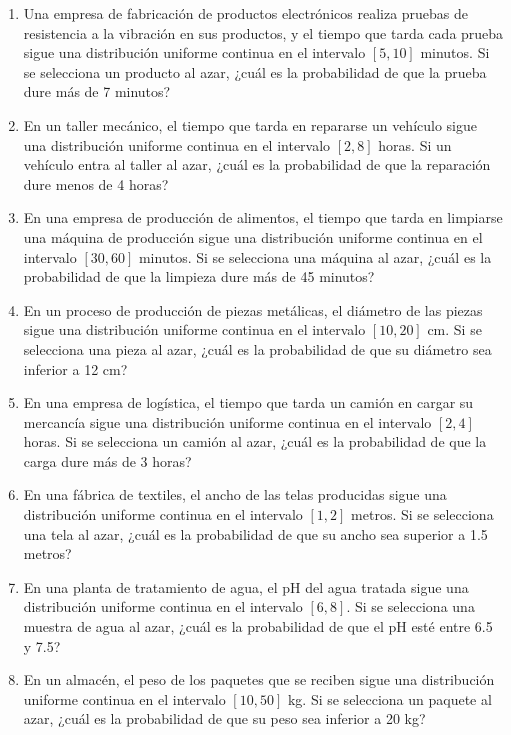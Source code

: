 \begin{Ejer}
\begin{enumerate}
    \item Una empresa de fabricación de productos electrónicos realiza pruebas de resistencia a la vibración en sus productos, y el tiempo que tarda cada prueba sigue una distribución uniforme continua en el intervalo $[5, 10]$ minutos. Si se selecciona un producto al azar, ¿cuál es la probabilidad de que la prueba dure más de 7 minutos?

    \item En un taller mecánico, el tiempo que tarda en repararse un vehículo sigue una distribución uniforme continua en el intervalo $[2, 8]$ horas. Si un vehículo entra al taller al azar, ¿cuál es la probabilidad de que la reparación dure menos de 4 horas?

    \item En una empresa de producción de alimentos, el tiempo que tarda en limpiarse una máquina de producción sigue una distribución uniforme continua en el intervalo $[30, 60]$ minutos. Si se selecciona una máquina al azar, ¿cuál es la probabilidad de que la limpieza dure más de 45 minutos?

    \item En un proceso de producción de piezas metálicas, el diámetro de las piezas sigue una distribución uniforme continua en el intervalo $[10, 20]$ cm. Si se selecciona una pieza al azar, ¿cuál es la probabilidad de que su diámetro sea inferior a 12 cm?

    \item En una empresa de logística, el tiempo que tarda un camión en cargar su mercancía sigue una distribución uniforme continua en el intervalo $[2, 4]$ horas. Si se selecciona un camión al azar, ¿cuál es la probabilidad de que la carga dure más de 3 horas?

    \item En una fábrica de textiles, el ancho de las telas producidas sigue una distribución uniforme continua en el intervalo $[1, 2]$ metros. Si se selecciona una tela al azar, ¿cuál es la probabilidad de que su ancho sea superior a 1.5 metros?

    \item En una planta de tratamiento de agua, el pH del agua tratada sigue una distribución uniforme continua en el intervalo $[6, 8]$. Si se selecciona una muestra de agua al azar, ¿cuál es la probabilidad de que el pH esté entre 6.5 y 7.5?

    \item En un almacén, el peso de los paquetes que se reciben sigue una distribución uniforme continua en el intervalo $[10, 50]$ kg. Si se selecciona un paquete al azar, ¿cuál es la probabilidad de que su peso sea inferior a 20 kg?


\end{enumerate}
\end{Ejer} 


